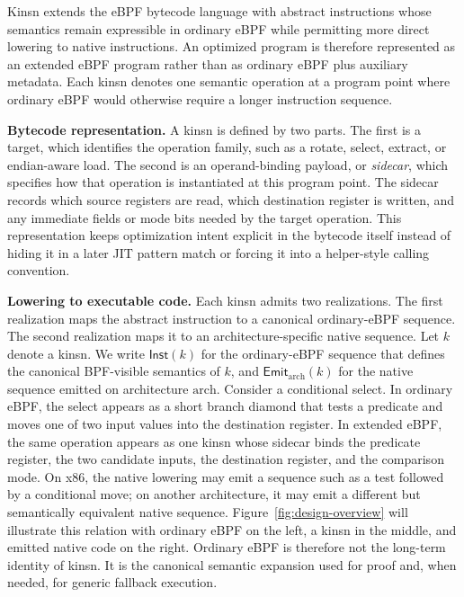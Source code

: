 Kinsn extends the eBPF bytecode language with abstract instructions whose semantics remain expressible in ordinary eBPF while permitting more direct lowering to native instructions. An optimized program is therefore represented as an extended eBPF program rather than as ordinary eBPF plus auxiliary metadata. Each kinsn denotes one semantic operation at a program point where ordinary eBPF would otherwise require a longer instruction sequence.

\noindent\textbf{Bytecode representation.} A kinsn is defined by two parts. The first is a target, which identifies the operation family, such as a rotate, select, extract, or endian-aware load. The second is an operand-binding payload, or \emph{sidecar}, which specifies how that operation is instantiated at this program point. The sidecar records which source registers are read, which destination register is written, and any immediate fields or mode bits needed by the target operation. This representation keeps optimization intent explicit in the bytecode itself instead of hiding it in a later JIT pattern match or forcing it into a helper-style calling convention.

\noindent\textbf{Lowering to executable code.} Each kinsn admits two realizations. The first realization maps the abstract instruction to a canonical ordinary-eBPF sequence. The second realization maps it to an architecture-specific native sequence. Let $k$ denote a kinsn. We write $\mathsf{Inst}(k)$ for the ordinary-eBPF sequence that defines the canonical BPF-visible semantics of $k$, and $\mathsf{Emit}_{\mathrm{arch}}(k)$ for the native sequence emitted on architecture $\mathrm{arch}$. Consider a conditional select. In ordinary eBPF, the select appears as a short branch diamond that tests a predicate and moves one of two input values into the destination register. In extended eBPF, the same operation appears as one kinsn whose sidecar binds the predicate register, the two candidate inputs, the destination register, and the comparison mode. On x86, the native lowering may emit a sequence such as a test followed by a conditional move; on another architecture, it may emit a different but semantically equivalent native sequence. Figure~\ref{fig:design-overview} will illustrate this relation with ordinary eBPF on the left, a kinsn in the middle, and emitted native code on the right. Ordinary eBPF is therefore not the long-term identity of kinsn. It is the canonical semantic expansion used for proof and, when needed, for generic fallback execution.

